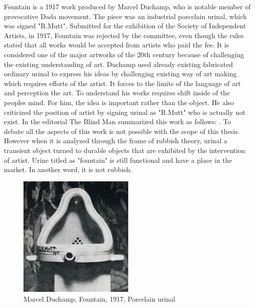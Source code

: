 Fountain is a 1917 work produced by Marcel Duchamp, who is notable member of provocative Dada movement. The piece was an industrial porcelain urinal, which was signed "R.Mutt". Submitted for the exhibition of the Society of Independent Artists, in 1917, Fountain was rejected by the committee, even though the rules stated that all works would be accepted from artists who paid the fee. It is considered one of the major artworks of the 20th century because of challenging the existing understanding of art. Duchamp used already existing fabricated ordinary urinal to express his ideas by challenging existing way of art making which requires efforts of the artist. It forces to the limits of the language of art and perception the art. To understand his works requires shift inside of the peoples mind. For him, the idea is important rather than the object. He also criticized the position of artist by signing urinal as "R.Mutt" who is actually not exist. In the editorial The Blind Man summarized this work as follows:  \citep{duchamp1917mutt}. To debate all the aspects of this work is not possible with the scope of this thesis. However when it is analyzed through the frame of rubbish theory, urinal a transient object turned to durable objects that are exhibited by the intervention of artist. Urine titled as "fountain" is still functional and have a place in the market. In another word, it is not rubbish.

\begin{figure}[h!]
  \centering
  \includegraphics[height=6cm]{graphics/Duchamp_Fountaine.jpg}
  \caption{Marcel Duchamp, Fountain, 1917, Porcelain urinal}
  \label{fig:Duchamp_Fountaine}
\end{figure}

